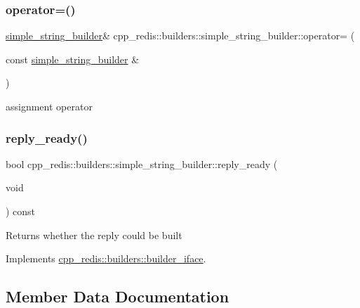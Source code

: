 \subsubsection{\texorpdfstring{operator=()}{operator=()}}
{\footnotesize\ttfamily \hyperlink{classcpp__redis_1_1builders_1_1simple__string__builder}{simple\+\_\+string\+\_\+builder}\& cpp\+\_\+redis\+::builders\+::simple\+\_\+string\+\_\+builder\+::operator= (\begin{DoxyParamCaption}\item[{const \hyperlink{classcpp__redis_1_1builders_1_1simple__string__builder}{simple\+\_\+string\+\_\+builder} \&}]{ }\end{DoxyParamCaption})\hspace{0.3cm}{\ttfamily [delete]}}



assignment operator 

\mbox{\label{classcpp__redis_1_1builders_1_1simple__string__builder_ad586164caf02b3022b91789cac23a72d}} 
\subsubsection{\texorpdfstring{reply\+\_\+ready()}{reply\_ready()}}
{\footnotesize\ttfamily bool cpp\+\_\+redis\+::builders\+::simple\+\_\+string\+\_\+builder\+::reply\+\_\+ready (\begin{DoxyParamCaption}\item[{void}]{ }\end{DoxyParamCaption}) const\hspace{0.3cm}{\ttfamily [virtual]}}

\begin{DoxyReturn}{Returns}
whether the reply could be built 
\end{DoxyReturn}


Implements \hyperlink{classcpp__redis_1_1builders_1_1builder__iface_a40db9a31d4ea1771777e74146d31e12d}{cpp\+\_\+redis\+::builders\+::builder\+\_\+iface}.



\subsection{Member Data Documentation}
\mbox{\label{classcpp__redis_1_1builders_1_1simple__string__builder_a8a9ee04b09475ab079db623f1d887757}} 
